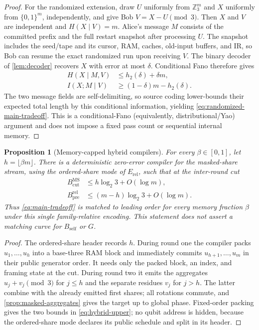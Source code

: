 \documentclass[aps,prx,reprint,floatfix,superscriptaddress]{revtex4-2}
\newtheorem{proposition}{Proposition}
\begin{document}
\begin{proof}
For the randomized extension, draw $U$ uniformly from $\mathbb Z_3^m$ and
$X$ uniformly from $\{0,1\}^m$, independently, and give Bob
$V=X-U\pmod3$.  Then $X$ and $V$ are independent and $H(X\mid V)=m$.
Alice's message $M$ consists of the committed prefix and the full restart
snapshot after processing $U$.  The snapshot includes the seed/tape and its
cursor, RAM, caches, old-input buffers, and IR, so Bob can resume the exact
randomized run upon receiving $V$.  The binary decoder of
\cref{lem:decoder} recovers $X$ with error at most $\delta$.  Conditional
Fano therefore gives
\begin{align*}
 H(X\mid M,V)&\leq h_2(\delta)+\delta m,\\
 I(X;M\mid V)&\geq(1-\delta)m-h_2(\delta).
\end{align*}
The two message fields are self-delimiting, so source coding lower-bounds
their expected total length by this conditional information, yielding
\eqref{eq:randomized-main-tradeoff}.  This is a conditional-Fano
(equivalently, distributional/Yao) argument and does not impose a fixed pass
count or sequential internal memory.
\end{proof}

\begin{proposition}[Memory-capped hybrid compilers]
\label{prop:hybrid-upper}
For every $\beta\in[0,1]$, let $h=\lfloor\beta m\rfloor$.  There is a
deterministic zero-error compiler for the masked-share stream, using the
ordered-share mode of $E_{\mathrm{rel}}$, such that at the inter-round cut
\begin{equation}\label{eq:hybrid-upper}
\begin{aligned}
 B_{\mathrm{cut}}^{\mathrm{MS}}
 &\leq h\log_2 3+O(\log m),\\
 B_{\mathrm{pre}}^{\mathrm{rel}}
 &\leq(m-h)\log_2 3+O(\log m).
\end{aligned}
\end{equation}
Thus \eqref{eq:main-tradeoff} is matched to leading order for every memory
fraction $\beta$ under this single family-relative encoding.  This statement
does not assert a matching curve for $B_{\mathrm{self}}$ or $G$.
\end{proposition}

\begin{proof}
The ordered-share header records $h$.  During round one the compiler packs
$u_1,\ldots,u_h$ into a base-three RAM block and immediately commits
$u_{h+1},\ldots,u_m$ in their public generator order.  It needs only the
packed block, an index, and framing state at the cut.  During round two it
emits the aggregates $u_j+v_j\pmod3$ for $j\leq h$ and the separate residues
$v_j$ for $j>h$.  The latter combine with the already emitted first shares;
all rotations commute, and \cref{prop:masked-aggregates} gives the target up
to global phase.  Fixed-order packing gives the two bounds in
\eqref{eq:hybrid-upper}; no qubit address is hidden, because the ordered-share
mode declares its public schedule and split in its header.
\end{proof}
\end{document}
